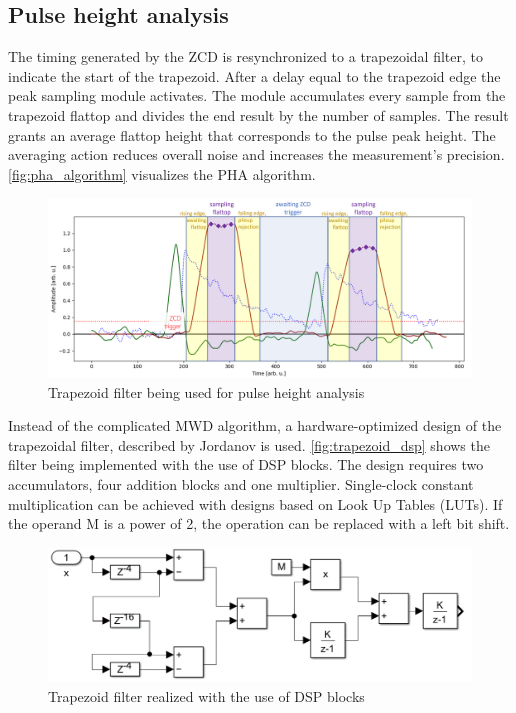 \subsection{Pulse height analysis}

The timing generated by the ZCD is resynchronized to a trapezoidal filter, 
to indicate the start of the trapezoid. After a delay equal to the 
trapezoid edge the peak sampling module activates. The module
accumulates every sample from the trapezoid flattop and 
divides the end result by the number of samples.
The result grants an average flattop height that corresponds
to the pulse peak height. The averaging action reduces overall noise
and increases the measurement's precision.
\autoref{fig:pha_algorithm} visualizes the PHA algorithm.

\begin{figure}[H]
  \centering
  \includegraphics[width=\linewidth]{media/pha_algorithm.png}
  \caption{Trapezoid filter being used for pulse height analysis}
  \label{fig:pha_algorithm} 
\end{figure}


Instead of the complicated MWD algorithm, a hardware-optimized 
design of the trapezoidal filter, described by Jordanov \cite{jordanov_trapezoidal}
is used. \autoref{fig:trapezoid_dsp} shows the filter being 
implemented with the use of DSP blocks. The design requires two 
accumulators, four addition blocks and one multiplier.
Single-clock constant multiplication can be achieved with designs
based on Look Up Tables (LUTs). If the operand M is a power of 2,
the operation can be replaced with a left bit shift.
\begin{figure}[H]
  \centering
  \includegraphics[width=\linewidth]{media/trapezoid_dsp.png}
  \caption{Trapezoid filter realized with the use of DSP blocks}
  \label{fig:trapezoid_dsp} 
\end{figure}

